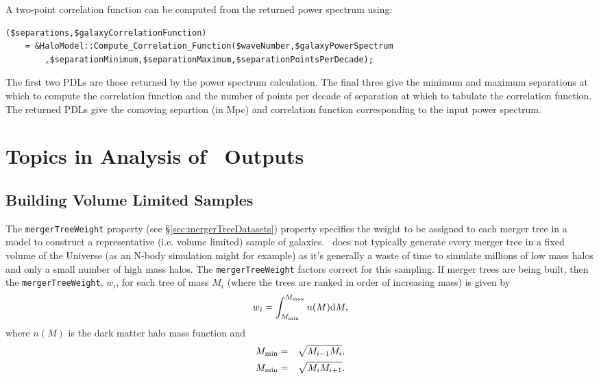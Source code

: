 A two-point correlation function can be computed from the returned power spectrum using:
\begin{verbatim}
($separations,$galaxyCorrelationFunction) 
    = &HaloModel::Compute_Correlation_Function($waveNumber,$galaxyPowerSpectrum
        ,$separationMinimum,$separationMaximum,$separationPointsPerDecade);
\end{verbatim}
The first two PDLs are those returned by the power spectrum calculation. The final three give the minimum and maximum separations at which to compute the correlation function and the number of points per decade of separation at which to tabulate the correlation function. The returned PDLs give the comoving separtion (in Mpc) and correlation function corresponding to the input power spectrum.

\section{Topics in Analysis of \glc\ Outputs}

\subsection{Building Volume Limited Samples}\label{sec:volumeLimitedSamples}

The {\tt mergerTreeWeight} property (see \S\ref{sec:mergerTreeDatasets}) property specifies the weight to be assigned to each merger tree in a model to construct a representative (i.e. volume limited) sample of galaxies. \glc\ does not typically generate every merger tree in a fixed volume of the Universe (as an N-body simulation might for example) as it's generally a waste of time to simulate millions of low mass halos and only a small number of high mass halos. The {\tt mergerTreeWeight} factors correct for this sampling. If merger trees are being built, then the {\tt mergerTreeWeight}, $w_i$, for each tree of mass $M_i$ (where the trees are ranked in order of increasing mass) is given by
\begin{equation}
 w_i = \int_{M_{\rm min}}^{M_{\rm max}} n(M) {\rm d}M,
\end{equation}
where $n(M)$ is the dark matter halo mass function and
\begin{eqnarray}
 M_{\rm min} &=& \sqrt{M_{i-1}M_i}, \\
 M_{\rm min} &=& \sqrt{M_i M_{i+1}}.
\end{eqnarray}


